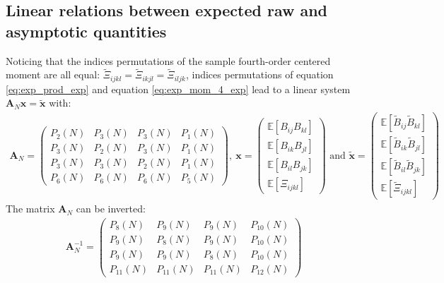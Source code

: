 \documentclass[12pt]{scrartcl}
\begin{document}
\subsection{Linear relations between expected raw and asymptotic quantities}
Noticing that the indices permutations of the sample fourth-order centered moment are all equal: $\widetilde{\Xi}_{ijkl} = \widetilde{\Xi}_{ikjl} = \widetilde{\Xi}_{iljk}$, indices permutations of equation \eqref{eq:exp_prod_exp} and equation \eqref{eq:exp_mom_4_exp} lead to a linear system $\mathbf{A}_N \mathbf{x} = \widetilde{\mathbf{x}}$ with:
\begin{align}
\mathbf{A}_N = \left( \begin{array}{cccc}
P_2(N) & P_3(N) & P_3(N) & P_1(N) \\
P_3(N) & P_2(N) & P_3(N) & P_1(N) \\
P_3(N) & P_3(N) & P_2(N) & P_1(N) \\
P_6(N) & P_6(N) & P_6(N) & P_5(N)
\end{array} \right) , \
\mathbf{x} = \left( \begin{array}{c}
\mathbb{E} \left[B_{ij} B_{kl}\right] \\
\mathbb{E} \left[B_{ik} B_{jl}\right] \\
\mathbb{E} \left[B_{il} B_{jk}\right] \\
\mathbb{E} \left[\Xi_{ijkl}\right]
\end{array} \right) \text{ and }
\widetilde{\mathbf{x}} = \left( \begin{array}{c}
\mathbb{E} \left[\widetilde{B}_{ij} \widetilde{B}_{kl}\right] \\
\mathbb{E} \left[\widetilde{B}_{ik} \widetilde{B}_{jl}\right] \\
\mathbb{E} \left[\widetilde{B}_{il} \widetilde{B}_{jk}\right] \\
\mathbb{E} \left[\widetilde{\Xi}_{ijkl}\right]
\end{array} \right) \nonumber
\end{align}
The matrix $\mathbf{A}_N$ can be inverted:
\begin{align}
\label{eq:invert_lin_sys}
\mathbf{A}_N^{-1} = \left( \begin{array}{cccc}
P_8(N) & P_9(N) & P_9(N) & P_{10}(N) \\
P_9(N) & P_8(N) & P_9(N) & P_{10}(N) \\
P_9(N) & P_9(N) & P_8(N) & P_{10}(N) \\
P_{11}(N) & P_{11}(N) & P_{11}(N) & P_{12}(N)
\end{array} \right)
\end{align}
\end{document}
